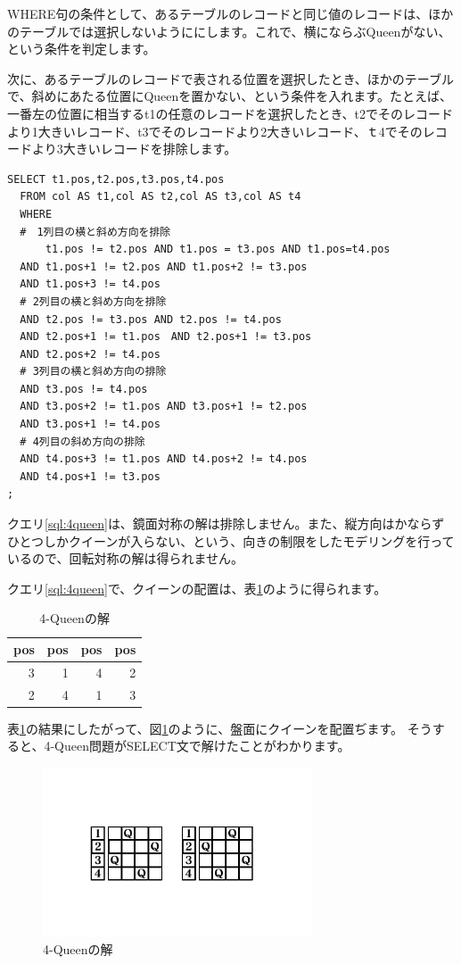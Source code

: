 WHERE句の条件として、あるテーブルのレコードと同じ値のレコードは、ほかのテーブルでは選択しないようににします。これで、横にならぶQueenがない、という条件を判定します。

次に、あるテーブルのレコードで表される位置を選択したとき、ほかのテーブルで、斜めにあたる位置にQueenを置かない、という条件を入れます。たとえば、一番左の位置に相当するt1の任意のレコードを選択したとき、t2でそのレコードより1大きいレコード、t3でそのレコードより2大きいレコード、ｔ4でそのレコードより3大きいレコードを排除します。

\begin{lstlisting}[caption=4-Queenを解く,label=sql:4queen]
SELECT t1.pos,t2.pos,t3.pos,t4.pos
  FROM col AS t1,col AS t2,col AS t3,col AS t4
  WHERE 
  #　1列目の横と斜め方向を排除
      t1.pos != t2.pos AND t1.pos = t3.pos AND t1.pos=t4.pos
  AND t1.pos+1 != t2.pos AND t1.pos+2 != t3.pos 
  AND t1.pos+3 != t4.pos
  # 2列目の横と斜め方向を排除
  AND t2.pos != t3.pos AND t2.pos != t4.pos
  AND t2.pos+1 != t1.pos　AND t2.pos+1 != t3.pos
  AND t2.pos+2 != t4.pos
  # 3列目の横と斜め方向の排除
  AND t3.pos != t4.pos
  AND t3.pos+2 != t1.pos AND t3.pos+1 != t2.pos
  AND t3.pos+1 != t4.pos
  # 4列目の斜め方向の排除
  AND t4.pos+3 != t1.pos AND t4.pos+2 != t4.pos
  AND t4.pos+1 != t3.pos
;
\end{lstlisting}

クエリ\ref{sql:4queen}は、鏡面対称の解は排除しません。また、縦方向はかならずひとつしかクイーンが入らない、という、向きの制限をしたモデリングを行っているので、回転対称の解は得られません。

クエリ\ref{sql:4queen}で、クイーンの配置は、表\ref{table:4queen}のように得られます。


\begin{table}[htbp]
  \begin{tabular}{|r|r|r|r|} \hline
    pos & pos & pos & pos \\ \hline \hline  
    3 & 1 & 4 & 2 \\
    2 & 4 & 1 & 3 \\ \hline
  \end{tabular}
  \caption{4-Queenの解}
  \label{table:4queen}
\end{table}

表\ref{table:4queen}の結果にしたがって、図\ref{fig:result}のように、盤面にクイーンを配置ぢます。
そうすると、4-Queen問題がSELECT文で解けたことがわかります。



\begin{figure}[htbp]
  \includegraphics[width=8cm,pagebox=cropbox]{draw/4queen-3.pdf}
  \caption{4-Queenの解}
  \label{fig:result}
\end{figure}
